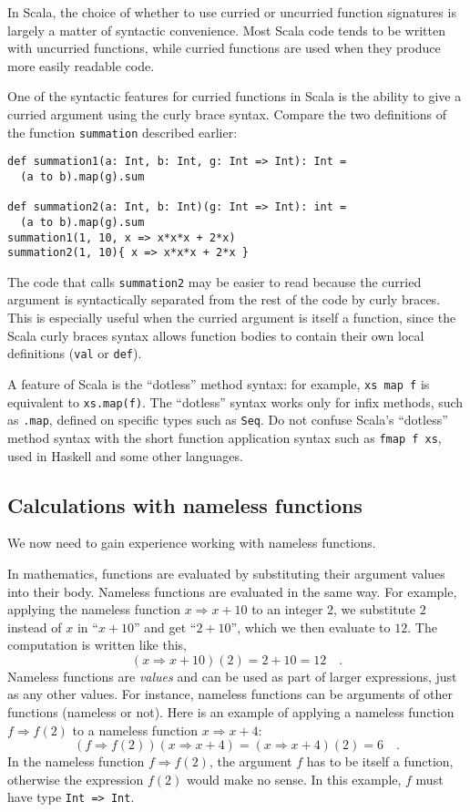 In Scala, the choice of whether to use curried or uncurried function
signatures is largely a matter of syntactic convenience. Most Scala
code tends to be written with uncurried functions, while curried functions
are used when they produce more easily readable code.

One of the syntactic features for curried functions in Scala is the
ability to give a curried argument using the curly brace syntax. Compare
the two definitions of the function \lstinline!summation! described
earlier:
\begin{lstlisting}
def summation1(a: Int, b: Int, g: Int => Int): Int =
  (a to b).map(g).sum

def summation2(a: Int, b: Int)(g: Int => Int): int =
  (a to b).map(g).sum
summation1(1, 10, x => x*x*x + 2*x)
summation2(1, 10){ x => x*x*x + 2*x }
\end{lstlisting}

The code that calls \lstinline!summation2! may be easier to read
because the curried argument is syntactically separated from the rest
of the code by curly braces. This is especially useful when the curried
argument is itself a function, since the Scala curly braces syntax
allows function bodies to contain their own local definitions (\lstinline!val!
or \lstinline!def!).

A feature of Scala is the ``dotless'' method syntax: for example,
\lstinline!xs map f! is equivalent to \lstinline!xs.map(f)!. The
``dotless'' syntax works only for infix methods, such as \lstinline!.map!,
defined on specific types such as \lstinline!Seq!. Do not confuse
Scala's ``dotless'' method syntax with the short function application
syntax such as \lstinline!fmap f xs!, used in Haskell and some other
languages.

\subsection{Calculations with nameless functions}

We now need to gain experience working with nameless functions.

In mathematics, functions are evaluated by substituting their argument
values into their body. Nameless functions are evaluated in the same
way. For example, applying the nameless function $x\Rightarrow x+10$
to an integer $2$, we substitute $2$ instead of $x$ in \textquotedblleft $x+10$\textquotedblright{}
and get \textquotedblleft $2+10$\textquotedblright , which we then
evaluate to $12$. The computation is written like this, 
\[
(x\Rightarrow x+10)(2)=2+10=12\quad.
\]
Nameless functions are \emph{values} and can be used as part of larger
expressions, just as any other values. For instance, nameless functions
can be arguments of other functions (nameless or not). Here is an
example of applying a nameless function $f\Rightarrow f(2)$ to a
nameless function $x\Rightarrow x+4$:
\[
\left(f\Rightarrow f(2)\right)(x\Rightarrow x+4)=(x\Rightarrow x+4)(2)=6\quad.
\]
In the nameless function $f\Rightarrow f(2)$, the argument $f$ has
to be itself a function, otherwise the expression $f(2)$ would make
no sense. In this example, $f$ must have type \lstinline!Int => Int!.

